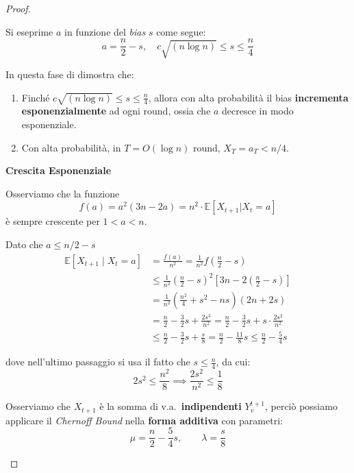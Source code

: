 \begin{teorema}
\begin{proof}
\begin{description}
            Si eseprime $a$ in funzione del \textit{bias} $s$ come segue:
                \[
                a = \frac{n}{2} - s, \quad c\sqrt{(n \log n)} \leq s \leq \frac{n}{4}
            \]

            In questa fase di dimostra che:
            \begin{enumerate}
                \item Finché $c\sqrt{(n \log n)} \leq s \leq \frac{n}{4}$, allora con alta probabilità il bias \textbf{incrementa esponenzialmente} ad ogni round, ossia che $a$ decresce in modo esponenziale.
                \item Con alta probabilità, in $T = O(\log n)$ round, $X_T = a_T < n/4$.
            \end{enumerate}

            \textbf{Crescita Esponenziale}

            Osserviamo che la funzione
            \[
                f(a) = {a^2}(3n - 2a) = n^2 \cdot \mathbb{E}[X_{t+1} | X_t = a]
            \]
            è sempre crescente per $1 < a < n$.

            Dato che $a \leq n/2 - s$
            \begin{align*}
            \mathbb{E}[X_{t+1} \mid X_t = a]
                &= \frac{f(a)}{n^2}
                = \frac{1}{n^2} f\!\left(\frac{n}{2} - s\right) \\
                &\leq \frac{1}{n^2} \left(\frac{n}{2} - s\right)^2
                    \left[3n - 2\left(\frac{n}{2} - s\right)\right] \\
                &= \frac{1}{n^2}
                \left(\frac{n^2}{4} + s^2 - ns\right)(2n + 2s) \\
                &= \frac{n}{2} - \frac{3}{2}s + \frac{2s^3}{n^2}
                = \frac{n}{2} - \frac{3}{2}s + s \cdot \frac{2s^2}{n^2} \\
                &\leq \frac{n}{2} - \frac{3}{2}s + \frac{s}{8}
                = \frac{n}{2} - \frac{11}{8}s
                \leq \frac{n}{2} - \frac{5}{4}s
            \end{align*}

            dove nell'ultimo passaggio si usa il fatto che $s \leq \frac{n}{4}$, da cui:
            \[
                2s^2 \leq \frac{n^2}{8}
                \implies
                \frac{2s^2}{n^2} \leq \frac{1}{8}
            \]

            Osserviamo che $X_{t+1}$ è la somma di v.a.\ \textbf{indipendenti} $Y_v^{t+1}$,
            perciò possiamo applicare il \textit{Chernoff Bound} nella \textbf{forma additiva}
            con parametri:
            \[
                \mu = \frac{n}{2} - \frac{5}{4}s, \qquad \lambda = \frac{s}{8}
            \]


\end{description}
\end{proof}
\end{teorema}
